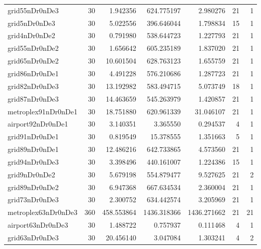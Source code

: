 \documentclass[../../../thesis.tex]{subfiles}
\begin{document}
\begin{longtable}{|l|r|r|r|r|r|r|}
grid55nDr0nDe3 & 30 & 1.942356 & 624.775197 & 2.980276 & 21 & 1 \\
grid5nDr0nDe3 & 30 & 5.022556 & 396.646044 & 1.798834 & 15 & 1 \\
grid4nDr0nDe2 & 30 & 0.791980 & 538.644723 & 1.227793 & 21 & 1 \\
grid55nDr0nDe2 & 30 & 1.656642 & 605.235189 & 1.837020 & 21 & 1 \\
grid65nDr0nDe2 & 30 & 10.601504 & 628.763123 & 1.655759 & 21 & 1 \\
grid86nDr0nDe1 & 30 & 4.491228 & 576.210686 & 1.287723 & 21 & 1 \\
grid82nDr0nDe3 & 30 & 13.192982 & 583.494715 & 5.073749 & 18 & 1 \\
grid87nDr0nDe3 & 30 & 14.463659 & 545.263979 & 1.420857 & 21 & 1 \\
metroplex91nDr0nDe1 & 30 & 18.751880 & 620.961339 & 31.046107 & 21 & 1 \\
airport92nDr0nDe1 & 30 & 3.140351 & 3.365550 & 0.294537 & 4 & 1 \\
grid91nDr0nDe1 & 30 & 0.819549 & 15.378555 & 1.351663 & 5 & 1 \\
grid89nDr0nDe1 & 30 & 12.486216 & 642.733865 & 4.573560 & 21 & 1 \\
grid94nDr0nDe3 & 30 & 3.398496 & 440.161007 & 1.224386 & 15 & 1 \\
grid9nDr0nDe2 & 30 & 5.679198 & 554.879477 & 9.527625 & 21 & 2 \\
grid89nDr0nDe2 & 30 & 6.947368 & 667.634534 & 2.360004 & 21 & 1 \\
grid73nDr0nDe3 & 30 & 2.300752 & 634.442574 & 3.205969 & 21 & 1 \\
metroplex63nDr0nDe3 & 360 & 458.553864 & 1436.318366 & 1436.271662 & 21 & 21 \\
airport63nDr0nDe3 & 30 & 1.488722 & 0.757937 & 0.111468 & 4 & 1 \\
grid63nDr0nDe3 & 30 & 20.456140 & 3.047084 & 1.303241 & 4 & 2 \\
\end{longtable}
\end{document}

